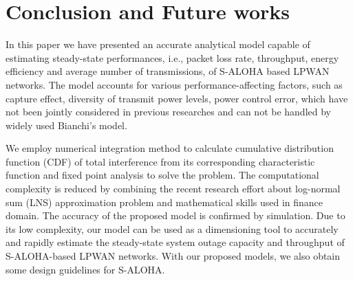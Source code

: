 \section{Conclusion and Future works}
\label{sec:conclusion}
In this paper we have presented an accurate analytical model capable of estimating steady-state performances, i.e., packet loss rate, throughput, energy efficiency and average number of transmissions, of S-ALOHA based LPWAN networks. The model accounts for various performance-affecting factors, such as capture effect, diversity of transmit power levels, power control error, which have not been jointly considered in previous researches and can not be handled by widely used Bianchi's model.

We employ numerical integration method to calculate cumulative distribution function (CDF) of total interference from its corresponding characteristic function and fixed point analysis to solve the problem. The computational complexity is reduced by combining the recent research effort about log-normal sum (LNS) approximation problem and mathematical skills used in finance domain. The accuracy of the proposed model is confirmed by simulation. Due to its low complexity, our model can be used as a dimensioning tool to accurately and rapidly estimate the steady-state system outage capacity and throughput of  S-ALOHA-based LPWAN networks. With our proposed models, we also obtain some design guidelines for S-ALOHA.
%
%
